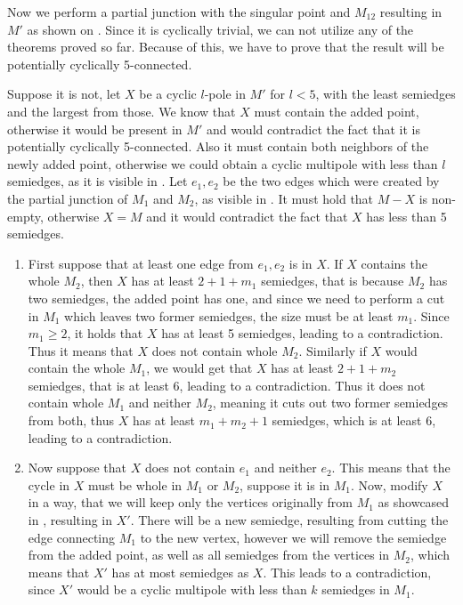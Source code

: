 \documentclass[12pt, twoside]{book}
\begin{document}
\begin{example}
	Now we perform a partial junction with the singular point and $M_{12}$ resulting in $M'$ as shown on . Since it is cyclically trivial, we can not utilize any of the theorems proved so far. Because of this, we have to prove that the result will be potentially cyclically 5-connected.
	
	Suppose it is not, let $X$ be a cyclic $l$-pole in $M'$ for $l<5$, with the least semiedges and the largest from those. We know that $X$ must contain the added point, otherwise it would be present in $M'$ and would contradict the fact that it is potentially cyclically 5-connected. Also it must contain both neighbors of the newly added point, otherwise we could obtain a cyclic multipole with less than $l$ semiedges, as it is visible in . Let $e_1,e_2$ be the two edges which were created by the partial junction of $M_1$ and $M_2$, as visible in .  It must hold that $M-X$ is non-empty, otherwise $X=M$ and it would contradict the fact that $X$ has less than 5 semiedges.
	\begin{enumerate}
		\item First suppose that at least one edge from $e_1,e_2$ is in $X$. If $X$ contains the whole $M_2$, then $X$ has at least $2+1+m_1$ semiedges, that is because $M_2$ has two semiedges, the added point has one, and since we need to perform a cut in $M_1$ which leaves two former semiedges, the size must be at least $m_1$. Since $m_1\geq 2$, it holds that $X$ has at least 5 semiedges, leading to a contradiction. Thus it means that $X$ does not contain whole $M_2$. Similarly if $X$ would contain the whole $M_1$, we would get that $X$ has at least $2+1+m_2$ semiedges, that is at least 6, leading to a contradiction. Thus it does not contain whole $M_1$ and neither $M_2$, meaning it cuts out two former semiedges from both, thus $X$ has at least $m_1+m_2+1$ semiedges, which is at least 6, leading to a contradiction.
		\item Now suppose that $X$ does not contain $e_1$ and neither $e_2$. This means that the cycle in $X$ must be whole in $M_1$ or $M_2$, suppose it is in $M_1$. Now, modify $X$ in a way, that we will keep only the vertices originally from $M_1$ as showcased in , resulting in $X'$. There will be a new semiedge, resulting from cutting the edge connecting $M_1$ to the new vertex, however we will remove the semiedge from the added point, as well as all semiedges from the vertices in $M_2$, which means that $X'$ has at most semiedges as $X$. This leads to a contradiction, since $X'$ would be a cyclic multipole with less than $k$ semiedges in $M_1$.
	\end{enumerate}


\end{example}
\end{document}
